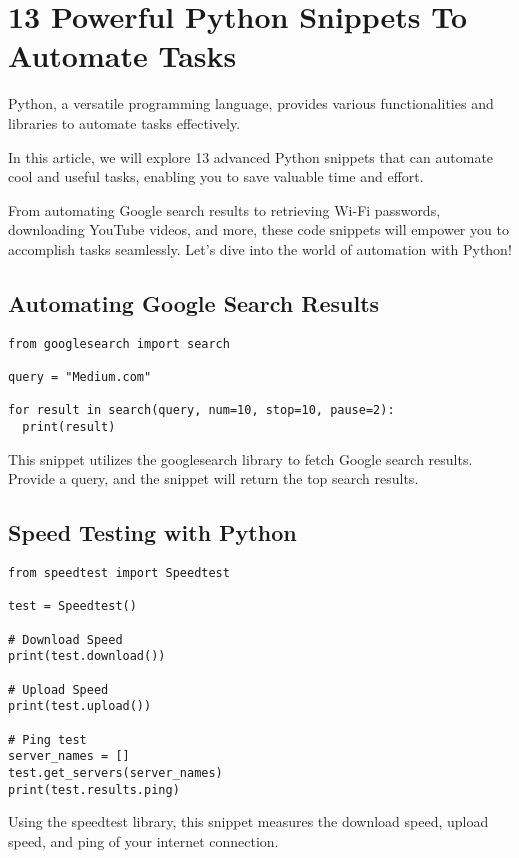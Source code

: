 

\chapter{13 Powerful Python Snippets To Automate Tasks}

Python, a versatile programming language, provides various functionalities and libraries to automate tasks effectively.

In this article, we will explore 13 advanced Python snippets that can automate cool and useful tasks, enabling you to save valuable time and effort.

From automating Google search results to retrieving Wi-Fi passwords, downloading YouTube videos, and more, these code snippets will empower you to accomplish tasks seamlessly. Let's dive into the world of automation with Python!

\section{Automating Google Search Results}

\begin{lstlisting}
from googlesearch import search
  
query = "Medium.com"
  
for result in search(query, num=10, stop=10, pause=2):
  print(result)
\end{lstlisting}


This snippet utilizes the googlesearch library to fetch Google search results. Provide a query, and the snippet will return the top search results.

\section{Speed Testing with Python}

\begin{lstlisting}
from speedtest import Speedtest

test = Speedtest()

# Download Speed
print(test.download())

# Upload Speed
print(test.upload())

# Ping test
server_names = []
test.get_servers(server_names)
print(test.results.ping)
\end{lstlisting}


Using the speedtest library, this snippet measures the download speed, upload speed, and ping of your internet connection.

